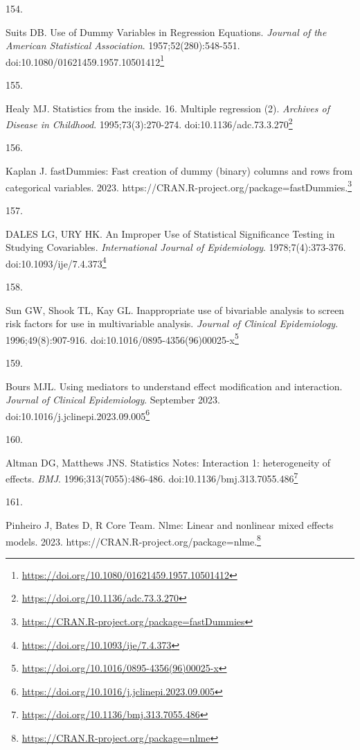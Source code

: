 \documentclass[
  a4paper,
]{book}
\newlength{\cslhangindent}
\newlength{\csllabelwidth}
\newlength{\cslentryspacingunit} %
\newenvironment{CSLReferences}[2] %
 {%
  \setlength{\parindent}{0pt}
  \ifodd #1
  \let\oldpar\par
  \def\par{\hangindent=\cslhangindent\oldpar}
  \fi
  \setlength{\parskip}{#2\cslentryspacingunit}
 }%
 {}
\newcommand{\CSLLeftMargin}[1]{\parbox[t]{\csllabelwidth}{#1}}
\newcommand{\CSLRightInline}[1]{\parbox[t]{\linewidth - \csllabelwidth}{#1}\break}
\renewcommand{\href}[2]{#2\footnote{\url{#1}}}
\begin{document}
\begin{CSLReferences}{0}{0}
\leavevmode{}%
\CSLLeftMargin{154. }%
\CSLRightInline{Suits DB. Use of Dummy Variables in Regression Equations. \emph{Journal of the American Statistical Association}. 1957;52(280):548-551. doi:\href{https://doi.org/10.1080/01621459.1957.10501412}{10.1080/01621459.1957.10501412}}

\leavevmode{}%
\CSLLeftMargin{155. }%
\CSLRightInline{Healy MJ. Statistics from the inside. 16. Multiple regression (2). \emph{Archives of Disease in Childhood}. 1995;73(3):270-274. doi:\href{https://doi.org/10.1136/adc.73.3.270}{10.1136/adc.73.3.270}}

\leavevmode{}%
\CSLLeftMargin{156. }%
\CSLRightInline{Kaplan J. fastDummies: Fast creation of dummy (binary) columns and rows from categorical variables. 2023. \href{https://CRAN.R-project.org/package=fastDummies}{https://CRAN.R-project.org/package=fastDummies.}}

\leavevmode{}%
\CSLLeftMargin{157. }%
\CSLRightInline{DALES LG, URY HK. An Improper Use of Statistical Significance Testing in Studying Covariables. \emph{International Journal of Epidemiology}. 1978;7(4):373-376. doi:\href{https://doi.org/10.1093/ije/7.4.373}{10.1093/ije/7.4.373}}

\leavevmode{}%
\CSLLeftMargin{158. }%
\CSLRightInline{Sun GW, Shook TL, Kay GL. Inappropriate use of bivariable analysis to screen risk factors for use in multivariable analysis. \emph{Journal of Clinical Epidemiology}. 1996;49(8):907-916. doi:\href{https://doi.org/10.1016/0895-4356(96)00025-x}{10.1016/0895-4356(96)00025-x}}

\leavevmode{}%
\CSLLeftMargin{159. }%
\CSLRightInline{Bours MJL. Using mediators to understand effect modification and interaction. \emph{Journal of Clinical Epidemiology}. September 2023. doi:\href{https://doi.org/10.1016/j.jclinepi.2023.09.005}{10.1016/j.jclinepi.2023.09.005}}

\leavevmode{}%
\CSLLeftMargin{160. }%
\CSLRightInline{Altman DG, Matthews JNS. Statistics Notes: Interaction 1: heterogeneity of effects. \emph{BMJ}. 1996;313(7055):486-486. doi:\href{https://doi.org/10.1136/bmj.313.7055.486}{10.1136/bmj.313.7055.486}}

\leavevmode{}%
\CSLLeftMargin{161. }%
\CSLRightInline{Pinheiro J, Bates D, R Core Team. Nlme: Linear and nonlinear mixed effects models. 2023. \href{https://CRAN.R-project.org/package=nlme}{https://CRAN.R-project.org/package=nlme.}}


\end{CSLReferences}
\end{document}
